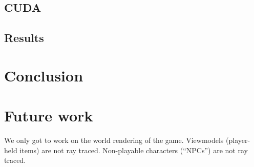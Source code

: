 \documentclass[]{article}
\begin{document}
\subsection{CUDA}

\subsection{Results}

\section{Conclusion}

\section{Future work}
We only got to work on the world rendering of the game.
Viewmodels (player-held items) are not ray traced.
Non-playable characters (\enquote{NPCs}) are not ray traced.

{}
%


\end{document}
